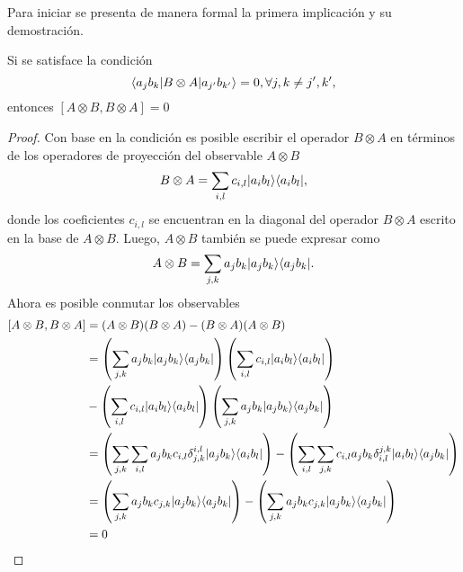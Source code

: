 Para iniciar se presenta de manera formal la primera implicación y su demostración.\begin{proposition}
    Si se satisface la condición  \[\langle a_j b_k|B\otimes A|a_{j'}b_{k'}\rangle=0, \forall j,k\ne j',k', \]  entonces $[A\otimes B,B \otimes A]=0$  
\end{proposition}

\begin{proof}
    Con base en la condición es posible escribir el operador $B\otimes A$  en términos de los operadores de proyección del observable $A\otimes B$ \[ B\otimes A = \sum_{i,l} c_{i,l} |a_{i}b_{l}\rangle \langle a_i b_l|,\] donde los coeficientes $c_{i,l}$ se encuentran en la diagonal del operador $B\otimes A$ escrito en la base de $A\otimes B$. Luego, $A\otimes B $ también se puede expresar como \[A\otimes B= \sum_{j,k} a_j b_k |a_{j}b_{k}\rangle \langle a_j b_k|.\] Ahora es posible conmutar los observables \[\begin{split}
        [A\otimes B,B \otimes A]&= (A\otimes B) (B\otimes A)-(B\otimes A) (A\otimes B)\\
        &=\left(\sum_{j,k} a_j b_k |a_{j}b_{k}\rangle \langle a_j b_k|\right)\left(\sum_{i,l} c_{i,l} |a_{i}b_{l}\rangle \langle a_i b_l|\right)\\
		&-\left( \sum_{i,l} c_{i,l} |a_{i}b_{l}\rangle \langle a_i b_l|\right)\left(\sum_{j,k} a_j b_k |a_{j}b_{k}\rangle \langle a_j b_k|\right)\\
		&=\left(\sum_{j,k} \sum_{i,l} a_j b_k  c_{i,l} \delta_{j,k}^{i,l}|a_{j}b_{k}\rangle \langle a_i b_l|\right)-\left( \sum_{i,l} \sum_{j,k} c_{i,l} a_j b_k \delta_{i,l}^{j,k}|a_{i}b_{l}\rangle \langle a_j b_k|\right)\\
		&=\left(\sum_{j,k}  a_j b_k  c_{j,k} |a_{j}b_{k}\rangle \langle a_j b_k|\right)-\left( \sum_{j,k} a_j b_k  c_{j,k} |a_{j}b_{k}\rangle \langle a_j b_k|\right)\\
		&=0
	\end{split}\]
\end{proof}

